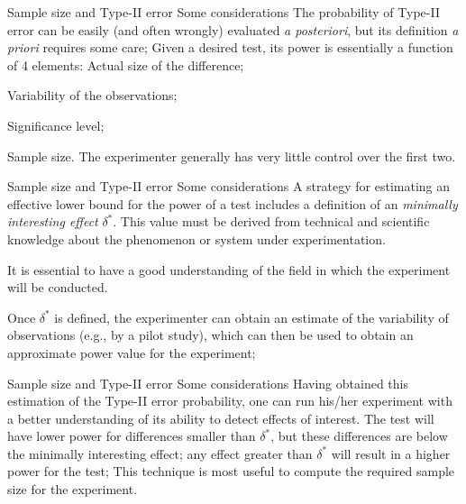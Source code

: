\documentclass[t]{beamer}
\begin{document}

\begin{ftst}{Sample size and Type-II error}
{Some considerations}
The probability of Type-II error can be easily (and often wrongly) evaluated \textit{a posteriori}, but its definition \textit{a priori} requires some care;
\vone
Given a desired test, its power is essentially a function of 4 elements:
\bitems Actual size of the difference;
	\item Variability of the observations;
	\item Significance level;
	\item Sample size.
\eitem
\vone
The experimenter generally has very little control over the first two.
\end{ftst}


\begin{ftst}{Sample size and Type-II error}
{Some considerations}
A strategy for estimating an effective lower bound for the power of a test includes a definition of an \textit{minimally interesting effect} $\delta^*$. 
\vone
This value must be derived from technical and scientific knowledge about the phenomenon or system under experimentation. 
\vhalf
\begin{block}{}
\centering It is essential to have a good understanding of the field in which the experiment will be conducted.
\end{block}
\vhalf
Once $\delta^*$ is defined, the experimenter can obtain an estimate of the variability of observations (e.g., by a pilot study), which can then be used to obtain an approximate power value for the experiment;
\end{ftst}


\begin{ftst}
{Sample size and Type-II error}
{Some considerations}
Having obtained this estimation of the Type-II error probability, one can run his/her experiment with a better understanding of its ability to detect effects of interest.
\vone
The test will have lower power for differences smaller than $\delta^*$, but these differences are below the minimally interesting effect; any effect greater than $\delta^*$ will result in a higher power for the test;
\vone
This technique is most useful to compute the required sample size for the experiment.
\end{ftst}

\end{document}
